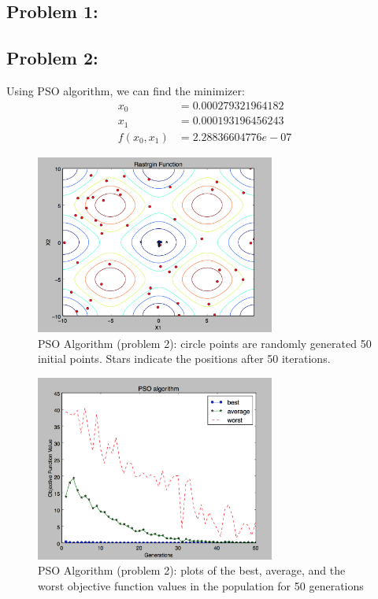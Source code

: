 \documentclass{article}
\begin{document}
 


\subsection*{{Problem 1: }}

\subsection*{{Problem 2: }}

Using PSO algorithm, we can find the minimizer: \\
\begin{align*}
x_0 & = 0.000279321964182 \\
x_1 & = 0.000193196456243 \\
f(x_0,x_1) & =  2.28836604776e-07
\end{align*}

\begin{figure}[h]
\includegraphics[width=0.7\textwidth]{PSO} 
\centering
\caption{PSO Algorithm (problem 2): circle points are randomly generated 50 initial points. Stars indicate the positions after 50 iterations. }

\end{figure}

\begin{figure}[h]
\includegraphics[width=0.7\textwidth]{PSO_min_best} 
\centering
\caption{PSO Algorithm (problem 2): plots of the best, average, and the worst objective function values in the population for 50 generations }

\end{figure}
\end{document}

